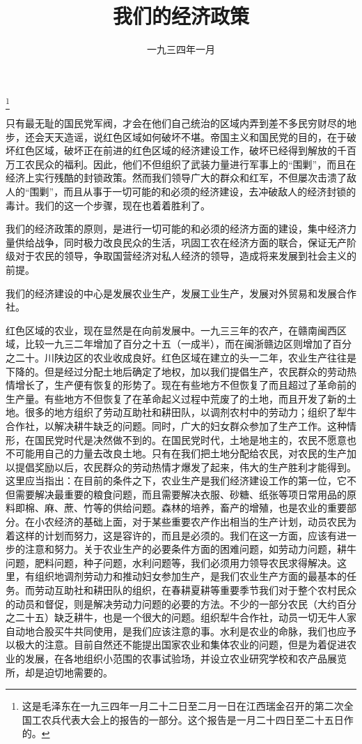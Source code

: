 
\title{我们的经济政策}
\date{一九三四年一月}
\thanks{这是毛泽东在一九三四年一月二十二日至二月一日在江西瑞金召开的第二次全国工农兵代表大会上的报告的一部分。这个报告是一月二十四日至二十五日作的。}
\maketitle


只有最无耻的国民党军阀，才会在他们自己统治的区域内弄到差不多民穷财尽的地步，还会天天造谣，说红色区域如何破坏不堪。帝国主义和国民党的目的，在于破坏红色区域，破坏正在前进的红色区域的经济建设工作，破坏已经得到解放的千百万工农民众的福利。因此，他们不但组织了武装力量进行军事上的“围剿”，而且在经济上实行残酷的封锁政策。然而我们领导广大的群众和红军，不但屡次击溃了敌人的“围剿”，而且从事于一切可能的和必须的经济建设，去冲破敌人的经济封锁的毒计。我们的这一个步骤，现在也着着胜利了。

我们的经济政策的原则，是进行一切可能的和必须的经济方面的建设，集中经济力量供给战争，同时极力改良民众的生活，巩固工农在经济方面的联合，保证无产阶级对于农民的领导，争取国营经济对私人经济的领导，造成将来发展到社会主义的前提。

我们的经济建设的中心是发展农业生产，发展工业生产，发展对外贸易和发展合作社。

红色区域的农业，现在显然是在向前发展中。一九三三年的农产，在赣南闽西区域，比较一九三二年增加了百分之十五（一成半），而在闽浙赣边区则增加了百分之二十。川陕边区的农业收成良好。红色区域在建立的头一二年，农业生产往往是下降的。但是经过分配土地后确定了地权，加以我们提倡生产，农民群众的劳动热情增长了，生产便有恢复的形势了。现在有些地方不但恢复了而且超过了革命前的生产量。有些地方不但恢复了在革命起义过程中荒废了的土地，而且开发了新的土地。很多的地方组织了劳动互助社和耕田队，以调剂农村中的劳动力；组织了犁牛合作社，以解决耕牛缺乏的问题。同时，广大的妇女群众参加了生产工作。这种情形，在国民党时代是决然做不到的。在国民党时代，土地是地主的，农民不愿意也不可能用自己的力量去改良土地。只有在我们把土地分配给农民，对农民的生产加以提倡奖励以后，农民群众的劳动热情才爆发了起来，伟大的生产胜利才能得到。这里应当指出：在目前的条件之下，农业生产是我们经济建设工作的第一位，它不但需要解决最重要的粮食问题，而且需要解决衣服、砂糖、纸张等项日常用品的原料即棉、麻、蔗、竹等的供给问题。森林的培养，畜产的增殖，也是农业的重要部分。在小农经济的基础上面，对于某些重要农产作出相当的生产计划，动员农民为着这样的计划而努力，这是容许的，而且是必须的。我们在这一方面，应该有进一步的注意和努力。关于农业生产的必要条件方面的困难问题，如劳动力问题，耕牛问题，肥料问题，种子问题，水利问题等，我们必须用力领导农民求得解决。这里，有组织地调剂劳动力和推动妇女参加生产，是我们农业生产方面的最基本的任务。而劳动互助社和耕田队的组织，在春耕夏耕等重要季节我们对于整个农村民众的动员和督促，则是解决劳动力问题的必要的方法。不少的一部分农民（大约百分之二十五）缺乏耕牛，也是一个很大的问题。组织犁牛合作社，动员一切无牛人家自动地合股买牛共同使用，是我们应该注意的事。水利是农业的命脉，我们也应予以极大的注意。目前自然还不能提出国家农业和集体农业的问题，但是为着促进农业的发展，在各地组织小范围的农事试验场，并设立农业研究学校和农产品展览所，却是迫切地需要的。

